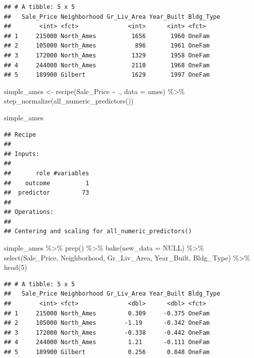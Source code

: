 \documentclass[
]{book}
\newenvironment{Shaded}{\begin{snugshade}}{\end{snugshade}}
\newcommand{\AttributeTok}[1]{\textcolor[rgb]{0.77,0.63,0.00}{#1}}
\newcommand{\ConstantTok}[1]{\textcolor[rgb]{0.00,0.00,0.00}{#1}}
\newcommand{\DecValTok}[1]{\textcolor[rgb]{0.00,0.00,0.81}{#1}}
\newcommand{\FunctionTok}[1]{\textcolor[rgb]{0.00,0.00,0.00}{#1}}
\newcommand{\NormalTok}[1]{#1}
\newcommand{\OtherTok}[1]{\textcolor[rgb]{0.56,0.35,0.01}{#1}}
\newcommand{\SpecialCharTok}[1]{\textcolor[rgb]{0.00,0.00,0.00}{#1}}
\begin{document}
\begin{verbatim}
## # A tibble: 5 x 5
##   Sale_Price Neighborhood Gr_Liv_Area Year_Built Bldg_Type
##        <int> <fct>              <int>      <int> <fct>    
## 1     215000 North_Ames          1656       1960 OneFam   
## 2     105000 North_Ames           896       1961 OneFam   
## 3     172000 North_Ames          1329       1958 OneFam   
## 4     244000 North_Ames          2110       1968 OneFam   
## 5     189900 Gilbert             1629       1997 OneFam
\end{verbatim}

\begin{Shaded}
\begin{Highlighting}[]
\NormalTok{simple\_ames }\OtherTok{\textless{}{-}} \FunctionTok{recipe}\NormalTok{(Sale\_Price }\SpecialCharTok{\textasciitilde{}}\NormalTok{ ., }\AttributeTok{data =}\NormalTok{ ames) }\SpecialCharTok{\%\textgreater{}\%}
  \FunctionTok{step\_normalize}\NormalTok{(}\FunctionTok{all\_numeric\_predictors}\NormalTok{())}

\NormalTok{simple\_ames}
\end{Highlighting}
\end{Shaded}

\begin{verbatim}
## Recipe
## 
## Inputs:
## 
##       role #variables
##    outcome          1
##  predictor         73
## 
## Operations:
## 
## Centering and scaling for all_numeric_predictors()
\end{verbatim}

\begin{Shaded}
\begin{Highlighting}[]
\NormalTok{simple\_ames }\SpecialCharTok{\%\textgreater{}\%} 
  \FunctionTok{prep}\NormalTok{() }\SpecialCharTok{\%\textgreater{}\%} 
  \FunctionTok{bake}\NormalTok{(}\AttributeTok{new\_data =} \ConstantTok{NULL}\NormalTok{) }\SpecialCharTok{\%\textgreater{}\%} 
  \FunctionTok{select}\NormalTok{(Sale\_Price, Neighborhood, Gr\_Liv\_Area, Year\_Built, Bldg\_Type) }\SpecialCharTok{\%\textgreater{}\%} 
  \FunctionTok{head}\NormalTok{(}\DecValTok{5}\NormalTok{)}
\end{Highlighting}
\end{Shaded}

\begin{verbatim}
## # A tibble: 5 x 5
##   Sale_Price Neighborhood Gr_Liv_Area Year_Built Bldg_Type
##        <int> <fct>              <dbl>      <dbl> <fct>    
## 1     215000 North_Ames         0.309     -0.375 OneFam   
## 2     105000 North_Ames        -1.19      -0.342 OneFam   
## 3     172000 North_Ames        -0.338     -0.442 OneFam   
## 4     244000 North_Ames         1.21      -0.111 OneFam   
## 5     189900 Gilbert            0.256      0.848 OneFam
\end{verbatim}
\end{document}
